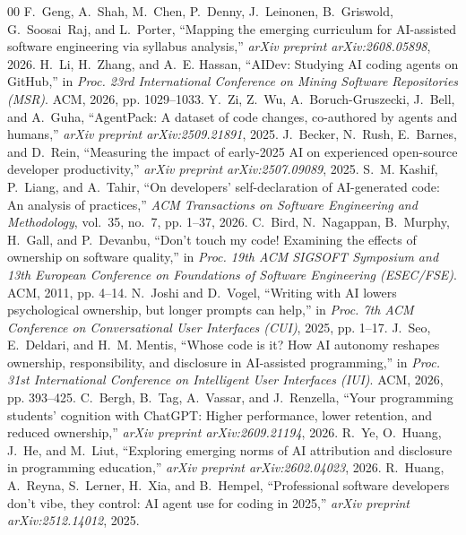 \documentclass[conference]{IEEEtran}
\begin{document}
\begin{thebibliography}{00}
 F.~Geng, A.~Shah, M.~Chen, P.~Denny, J.~Leinonen, B.~Griswold, G.~Soosai~Raj, and L.~Porter, ``Mapping the emerging curriculum for AI-assisted software engineering via syllabus analysis,'' \emph{arXiv preprint arXiv:2608.05898}, 2026.
 H.~Li, H.~Zhang, and A.~E. Hassan, ``AIDev: Studying AI coding agents on GitHub,'' in \emph{Proc. 23rd International Conference on Mining Software Repositories (MSR)}. ACM, 2026, pp. 1029--1033.
 Y.~Zi, Z.~Wu, A.~Boruch-Gruszecki, J.~Bell, and A.~Guha, ``AgentPack: A dataset of code changes, co-authored by agents and humans,'' \emph{arXiv preprint arXiv:2509.21891}, 2025.
 J.~Becker, N.~Rush, E.~Barnes, and D.~Rein, ``Measuring the impact of early-2025 AI on experienced open-source developer productivity,'' \emph{arXiv preprint arXiv:2507.09089}, 2025.
 S.~M. Kashif, P.~Liang, and A.~Tahir, ``On developers' self-declaration of AI-generated code: An analysis of practices,'' \emph{ACM Transactions on Software Engineering and Methodology}, vol.~35, no.~7, pp. 1--37, 2026.
 C.~Bird, N.~Nagappan, B.~Murphy, H.~Gall, and P.~Devanbu, ``Don't touch my code! Examining the effects of ownership on software quality,'' in \emph{Proc. 19th ACM SIGSOFT Symposium and 13th European Conference on Foundations of Software Engineering (ESEC/FSE)}. ACM, 2011, pp. 4--14.
 N.~Joshi and D.~Vogel, ``Writing with AI lowers psychological ownership, but longer prompts can help,'' in \emph{Proc. 7th ACM Conference on Conversational User Interfaces (CUI)}, 2025, pp. 1--17.
 J.~Seo, E.~Deldari, and H.~M. Mentis, ``Whose code is it? How AI autonomy reshapes ownership, responsibility, and disclosure in AI-assisted programming,'' in \emph{Proc. 31st International Conference on Intelligent User Interfaces (IUI)}. ACM, 2026, pp. 393--425.
 C.~Bergh, B.~Tag, A.~Vassar, and J.~Renzella, ``Your programming students' cognition with ChatGPT: Higher performance, lower retention, and reduced ownership,'' \emph{arXiv preprint arXiv:2609.21194}, 2026.
 R.~Ye, O.~Huang, J.~He, and M.~Liut, ``Exploring emerging norms of AI attribution and disclosure in programming education,'' \emph{arXiv preprint arXiv:2602.04023}, 2026.
 R.~Huang, A.~Reyna, S.~Lerner, H.~Xia, and B.~Hempel, ``Professional software developers don't vibe, they control: AI agent use for coding in 2025,'' \emph{arXiv preprint arXiv:2512.14012}, 2025.

\end{thebibliography}
\end{document}

